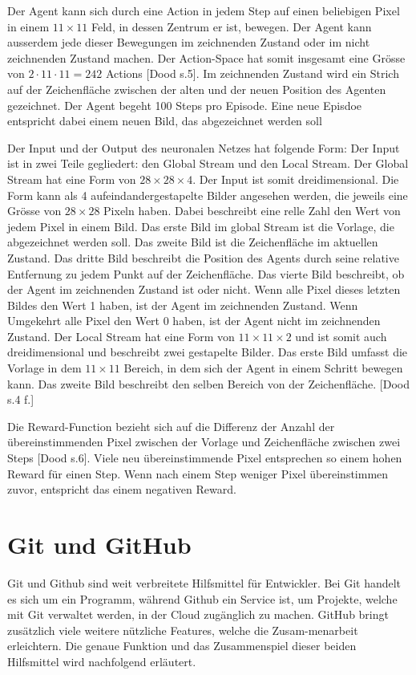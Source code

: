 Der Agent kann sich durch eine Action in jedem Step auf einen beliebigen Pixel
in einem $11\times11$ Feld, in dessen Zentrum er ist, bewegen. Der Agent kann
ausserdem jede dieser Bewegungen im zeichnenden Zustand oder im nicht
zeichnenden Zustand machen. Der Action-Space hat somit insgesamt eine Grösse von
$2\cdot11\cdot11 = 242$ Actions [Dood s.5]. Im zeichnenden Zustand wird ein Strich auf der
Zeichenfläche zwischen der alten und der neuen Position des Agenten gezeichnet.
Der Agent begeht 100 Steps pro Episode. Eine neue Episdoe entspricht dabei einem
neuen Bild, das abgezeichnet werden soll

Der Input und der Output des neuronalen Netzes hat folgende Form: Der Input ist
in zwei Teile gegliedert: den Global Stream und den Local Stream. 
Der Global Stream hat eine Form von $28\times28\times4$. Der Input ist somit
dreidimensional. Die Form kann als 4 aufeindandergestapelte Bilder angesehen
werden, die jeweils eine Grösse von $28\times28$ Pixeln haben. Dabei beschreibt
eine relle Zahl den Wert von jedem Pixel in einem Bild. Das erste Bild im global
Stream ist die Vorlage, die abgezeichnet werden soll. Das zweite Bild ist die
Zeichenfläche im aktuellen Zustand. Das dritte Bild beschreibt die Position des
Agents durch seine relative Entfernung zu jedem Punkt auf der Zeichenfläche. Das
vierte Bild beschreibt, ob der Agent im zeichnenden Zustand ist oder nicht. Wenn
alle Pixel dieses letzten Bildes den Wert 1 haben, ist der Agent im zeichnenden
Zustand. Wenn Umgekehrt alle Pixel den Wert 0 haben, ist der Agent nicht im
zeichnenden Zustand. 
Der Local Stream hat eine Form von $11\times11\times2$ und ist somit auch
dreidimensional und beschreibt zwei gestapelte Bilder. Das erste Bild umfasst
die Vorlage in dem $11\times11$ Bereich, in dem sich der Agent in einem Schritt
bewegen kann. Das zweite Bild beschreibt den selben Bereich von der Zeichenfläche. [Dood s.4 f.]

Die Reward-Function bezieht sich auf die Differenz der Anzahl der
übereinstimmenden Pixel zwischen der Vorlage und Zeichenfläche zwischen zwei
Steps [Dood s.6]. Viele neu übereinstimmende Pixel entsprechen so einem hohen Reward für
einen Step. Wenn nach einem Step weniger Pixel übereinstimmen zuvor, entspricht
das einem negativen Reward. 

\section{Git und GitHub}
\label{chap:git_github}
Git und Github sind weit verbreitete Hilfsmittel für Entwickler. Bei Git handelt
es sich um ein Programm, während Github ein Service ist, um Projekte, welche mit
Git verwaltet werden, in der Cloud zugänglich zu machen. GitHub bringt zusätzlich
viele weitere nützliche Features, welche die Zusam\hyp{}menarbeit erleichtern. Die
genaue Funktion und das Zusammenspiel dieser beiden Hilfsmittel wird nachfolgend
erläutert.

